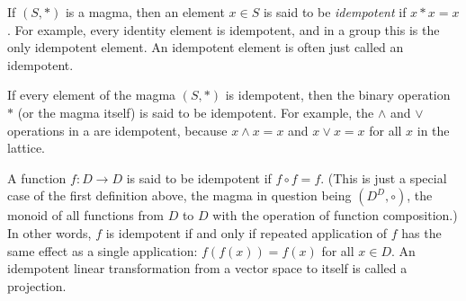 \documentclass[12pt]{article}
\begin{document}

If $(S,*)$ is a magma, then an element $x\in S$ is said to be \emph{idempotent} if $x*x=x$.
For example, every identity element is idempotent, and in a group this is the only idempotent element.
An idempotent element is often just called an idempotent.

If every element of the magma $(S,*)$ is idempotent, then the binary operation $*$ (or the magma itself) is said to be idempotent. For example, the $\land$ and $\lor$ operations in a  are idempotent, because $x\land x = x$ and $x\lor x = x$ for all $x$ in the lattice.

A function $f\colon D\to D$ is said to be idempotent if $f\circ f=f$. (This is just a special case of the first definition above, the magma in question being $(D^D,\circ)$, the monoid of all functions from $D$ to $D$ with the operation of function composition.) In other words, $f$ is idempotent if and only if repeated application of $f$ has the same effect as a single application: $f(f(x)) = f(x)$ for all $x\in D$. An idempotent linear transformation from a vector space to itself is called a  projection.
\end{document}
